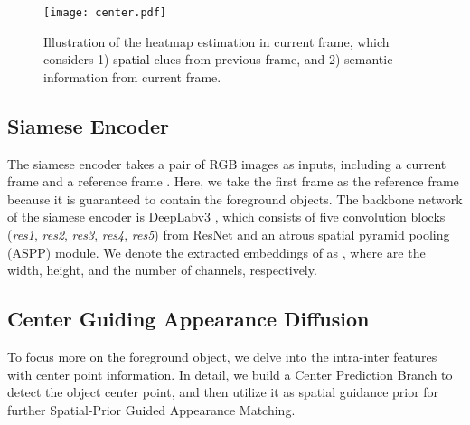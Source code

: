 \documentclass[letterpaper]{article} \usepackage{aaai20}  \usepackage{times}  \usepackage{helvet} \usepackage{courier}  \usepackage[hyphens]{url}  \usepackage{graphicx} \urlstyle{rm} \def\UrlFont{\rm}  \usepackage{graphicx}  \frenchspacing  \setlength{\pdfpagewidth}{8.5in}  \setlength{\pdfpageheight}{11in}  \usepackage{amssymb}
\newcommand{\ldz}[1]{\textcolor{black}{#1}}
\begin{document}
\begin{figure}[t!]
\centering
\texttt{[image: center.pdf]}
\caption{Illustration of the heatmap estimation in current frame, which considers 1) \ldz{spatial} clues  from previous frame, and 2) semantic information  from current frame.}
\label{fig:center}
\vspace{-12pt}
\end{figure}

\subsection{Siamese Encoder}
The siamese encoder takes a pair of RGB images as inputs, including a current frame  and a reference frame .
Here, we take the first frame  as the reference frame because it is guaranteed to contain the foreground objects.
The backbone network of the siamese encoder is DeepLabv3 \cite{chen2017rethinking}, which consists of five convolution blocks (\textit{res1}, \textit{res2}, \textit{res3}, \textit{res4}, \textit{res5}) from ResNet \cite{he2016deep} and an atrous spatial pyramid pooling (ASPP) module. We denote the extracted embeddings of  as , where  are the width, height, and the number of channels, respectively.

\subsection{Center Guiding Appearance Diffusion}
To focus more on the foreground object, we delve into the intra-inter features with center point information. In detail, we build a Center Prediction Branch to detect the object center point, and then utilize it as spatial guidance prior for further Spatial-Prior Guided Appearance Matching.
\end{document}
